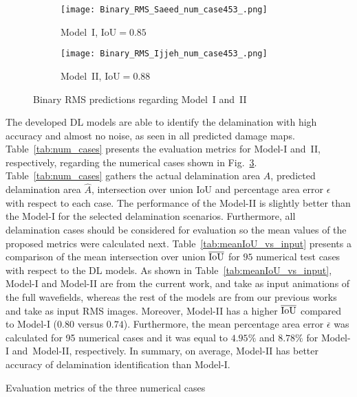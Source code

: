 \begin{sloppypar}
\begin{figure}[ht!]
\begin{subfigure}[b]{0.32\textwidth}
			\centering
			\texttt{[image: Binary\_RMS\_Saeed\_num\_case453\_.png]}
			\caption{Model~I, IoU\(=0.85\)}
			\label{fig:Convlstm_binary_RMS_453}
		\end{subfigure}
		\hfill
		\begin{subfigure}[b]{0.32\textwidth}
			\centering
			\texttt{[image: Binary\_RMS\_Ijjeh\_num\_case453\_.png]}
			\caption{Model~II, IoU\(=0.88\)}
			\label{fig:AE_binary_RMS_453}
		\end{subfigure}
		\caption{Binary RMS predictions regarding Model~I and~II}
		\label{fig:RMS_num_cases}
	\end{figure}
	
	The developed DL models are able to identify the delamination with high accuracy and almost no noise, as seen in all predicted damage maps.
	Table~\ref{tab:num_cases} presents the evaluation metrics for Model-I and~II, respectively, regarding the numerical cases shown in Fig.~\ref{fig:RMS_num_cases}.
	Table~\ref{tab:num_cases} gathers the actual delamination area \(A\), predicted delamination area \(\hat{A}\), intersection over union IoU and percentage area error \(\epsilon\) with respect to each case. 
	The performance of the Model-II is slightly better than the Model-I for the selected delamination scenarios.
	Furthermore, all delamination cases should be considered for evaluation so the mean values of the proposed metrics were calculated next.
	Table~\ref{tab:meanIoU_vs_input} presents a comparison of the mean intersection over union \(\overline{\textup{IoU}}\) for \(95\) numerical test cases with respect to the DL models.
	As shown in Table~\ref{tab:meanIoU_vs_input}, Model-I and Model-II are from the current work, and take as input animations of the full wavefields, whereas the rest of the models are from our previous works~\cite{Ijjeh2021, Ijjeh2022} and take as input RMS images.
	Moreover, Model-II has a higher \(\overline{\textup{IoU}}\) compared to Model-I (\(0.80\) versus \(0.74\)).
	Furthermore, the mean percentage area error \(\overline{\epsilon}\) was calculated for 95 numerical cases and it was equal to \(4.95 \%\) and \(8.78\%\) for Model-I and~Model-II, respectively.
	In summary, on average, Model-II has better accuracy of delamination identification than Model-I.
	\begin{table}[ht!]
		\caption{Evaluation metrics of the three numerical cases}

\end{table}
\end{sloppypar}
